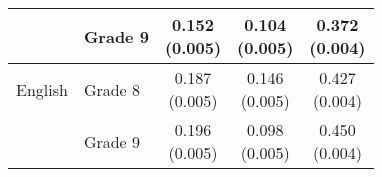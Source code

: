 \begin{tabular}{llccc}
 & Grade 9 & \makecell[tc]{0.152\\(0.005)} & \makecell[tc]{0.104\\(0.005)} & \makecell[tc]{0.372\\(0.004)} \\
\hline 
English & Grade 8 & \makecell[tc]{0.187\\(0.005)} & \makecell[tc]{0.146\\(0.005)} & \makecell[tc]{0.427\\(0.004)} \\
 & Grade 9 & \makecell[tc]{0.196\\(0.005)} & \makecell[tc]{0.098\\(0.005)} & \makecell[tc]{0.450\\(0.004)} \\
\hline \hline 
\end{tabular}